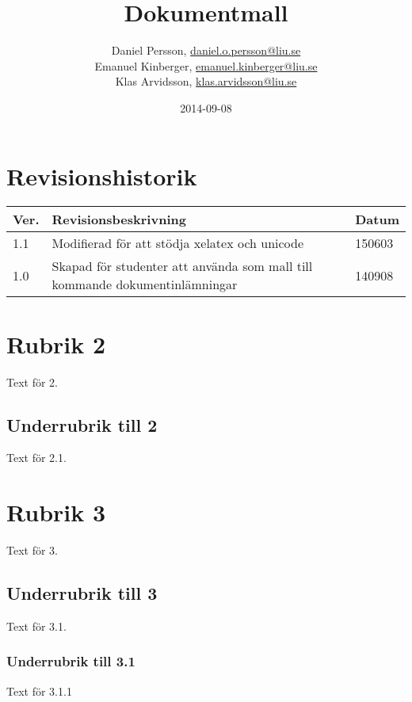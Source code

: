 \documentclass{TDP003mall}
\author{Daniel Persson, \url{daniel.o.persson@liu.se}\\
  Emanuel Kinberger, \url{emanuel.kinberger@liu.se}\\
  Klas Arvidsson, \url{klas.arvidsson@liu.se}}
\title{Dokumentmall}
\date{2014-09-08}
\begin{document}
\projectpage
\section{Revisionshistorik}
\begin{table}[!h]
\begin{tabularx}{\linewidth}{|l|X|l|}
\hline
Ver. & Revisionsbeskrivning & Datum \\\hline
1.1 & Modifierad för att stödja xelatex och unicode & 150603 \\\hline
1.0 & Skapad för studenter att använda som mall till
kommande dokumentinlämningar & 140908 \\\hline
\end{tabularx}
\end{table}


\section{Rubrik 2}
Text för 2.

\subsection{Underrubrik till 2}
Text för 2.1.

\section{Rubrik 3}
Text för 3.

\subsection{Underrubrik till 3}
Text för 3.1.

\subsubsection{Underrubrik till 3.1}
Text för 3.1.1
\end{document}
